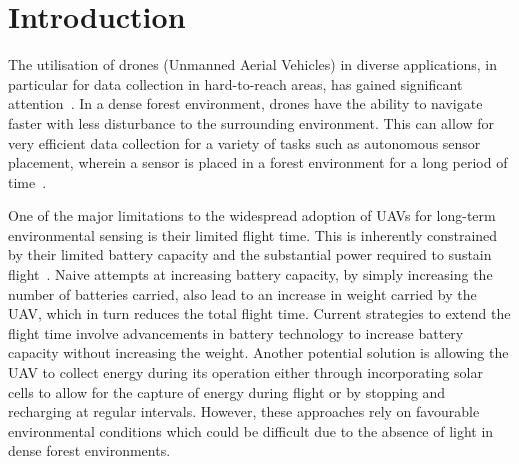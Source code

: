 \chapter{Introduction}

The utilisation of drones (Unmanned Aerial Vehicles) in diverse applications, in particular for data collection in hard-to-reach areas, has gained significant attention~\cite{droneReview}.
In a dense forest environment, drones have the ability to navigate faster with less disturbance to the surrounding environment.
This can allow for very efficient data collection for a variety of tasks such as autonomous sensor placement, wherein a sensor is placed in a forest environment for a long period of time~\cite{environmentalSensing}.

One of the major limitations to the widespread adoption of UAVs for long-term environmental sensing is their limited flight time.
This is inherently constrained by their limited battery capacity and the substantial power required to sustain flight~\cite{droneBattery}.
Naive attempts at increasing battery capacity, by simply increasing the number of batteries carried, also lead to an increase in weight carried by the UAV, which in turn reduces the total flight time.
Current strategies to extend the flight time involve advancements in battery technology to increase battery capacity without increasing the weight.
Another potential solution is allowing the UAV to collect energy during its operation either through incorporating solar cells to allow for the capture of energy during flight \cite{droneSunlight} or by stopping and recharging at regular intervals.
However, these approaches rely on favourable environmental conditions which could be difficult due to the absence of light in dense forest environments.

